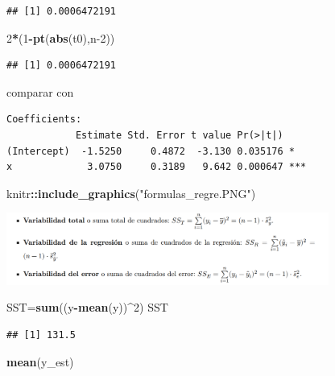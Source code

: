 \documentclass[
]{article}
\newenvironment{Shaded}{\begin{snugshade}}{\end{snugshade}}
\newcommand{\DecValTok}[1]{\textcolor[rgb]{0.00,0.00,0.81}{#1}}
\newcommand{\KeywordTok}[1]{\textcolor[rgb]{0.13,0.29,0.53}{\textbf{#1}}}
\newcommand{\NormalTok}[1]{#1}
\newcommand{\OperatorTok}[1]{\textcolor[rgb]{0.81,0.36,0.00}{\textbf{#1}}}
\newcommand{\StringTok}[1]{\textcolor[rgb]{0.31,0.60,0.02}{#1}}
\begin{document}
\begin{verbatim}
## [1] 0.0006472191
\end{verbatim}

\begin{Shaded}
\begin{Highlighting}[]
\DecValTok{2}\OperatorTok{*}\NormalTok{(}\DecValTok{1}\OperatorTok{{-}}\KeywordTok{pt}\NormalTok{(}\KeywordTok{abs}\NormalTok{(t0),n}\DecValTok{{-}2}\NormalTok{))}
\end{Highlighting}
\end{Shaded}

\begin{verbatim}
## [1] 0.0006472191
\end{verbatim}

comparar con

\begin{verbatim}
Coefficients:
            Estimate Std. Error t value Pr(>|t|)    
(Intercept)  -1.5250     0.4872  -3.130 0.035176 *  
x             3.0750     0.3189   9.642 0.000647 ***
\end{verbatim}

\begin{Shaded}
\begin{Highlighting}[]
\NormalTok{knitr}\OperatorTok{::}\KeywordTok{include\_graphics}\NormalTok{(}\StringTok{"formulas\_regre.PNG"}\NormalTok{)}
\end{Highlighting}
\end{Shaded}

\includegraphics[width=400px]{formulas_regre}

\begin{Shaded}
\begin{Highlighting}[]
\NormalTok{SST=}\KeywordTok{sum}\NormalTok{((y}\OperatorTok{{-}}\KeywordTok{mean}\NormalTok{(y))}\OperatorTok{\^{}}\DecValTok{2}\NormalTok{)}
\NormalTok{SST}
\end{Highlighting}
\end{Shaded}

\begin{verbatim}
## [1] 131.5
\end{verbatim}

\begin{Shaded}
\begin{Highlighting}[]
\KeywordTok{mean}\NormalTok{(y\_est)}
\end{Highlighting}
\end{Shaded}
\end{document}
